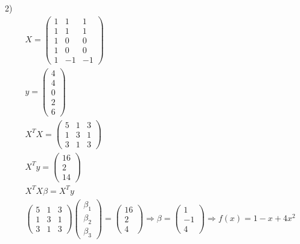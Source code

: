 \documentclass{report}
\begin{document}
\par 2)
\begin{align*}
& X = \begin{pmatrix}
    1 & 1 & 1 \\
    1 & 1 & 1 \\
    1 & 0 & 0 \\
    1 & 0 & 0 \\
    1 & -1 & -1
\end{pmatrix} \\
& y = \begin{pmatrix} 4 \\ 4 \\ 0 \\ 2 \\ 6 \end{pmatrix} \\
& X^T X = \begin{pmatrix}
    5 & 1 & 3 \\
    1 & 3 & 1 \\
    3 & 1 & 3
\end{pmatrix} \\
& X^T y = \begin{pmatrix} 16 \\ 2 \\ 14 \end{pmatrix} \\
& X^T X \beta = X^T y \\
& \begin{pmatrix}
    5 & 1 & 3 \\
    1 & 3 & 1 \\
    3 & 1 & 3
\end{pmatrix} \begin{pmatrix} \beta_1 \\ \beta_2 \\ \beta_3 \end{pmatrix} = \begin{pmatrix} 16 \\ 2 \\ 4 \end{pmatrix}
\Rightarrow \beta = \begin{pmatrix} 1 \\ -1 \\ 4 \end{pmatrix} \Rightarrow f(x) = 1 - x + 4x^2
\end{align*}
\end{document}
